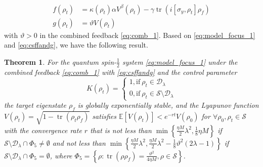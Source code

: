 \documentclass[]{elsarticle}
\newtheorem{thm}{Theorem}
\begin{document}
\begin{subequations}\label{eq:csffandg}
	\begin{align}
		f\left(\rho_t\right)&=\kappa\left(\rho_{t}\right)\alpha V^{\beta}\left(\rho_{t}\right)-\gamma \operatorname{tr}\left(i\left[\sigma_{y}, \rho_{t}\right] \rho_f\right)\\
		g\left(\rho_t\right)&=\vartheta V\left(\rho_{t}\right)
	\end{align}
\end{subequations}
with $\vartheta>0$ in the combined feedback \eqref{eq:comb_1}.
Based on \eqref{eq:model_focus_1} and \eqref{eq:csffandg}, we have the following result.
\begin{thm}\label{thm:exponentially_stable_f1}
	For the quantum spin-$\frac{1}{2}$ system \eqref{eq:model_focus_1} under the combined feedback \eqref{eq:comb_1} with \eqref{eq:csffandg} and the control parameter
	\begin{equation}\label{eq:kappa_1}
		K\left(\rho_t\right)=\left\{ \begin{array}{l}1, \text{if}~\rho_t\in \mathcal{D}_\lambda\\ 0, \text{if}~\rho_t\in \mathcal{S}\setminus \mathcal{D}_\lambda\end{array} \right. 
	\end{equation}
	the target eigenstate $\rho_f$ is globally exponentially stable, and the Lyapunov function $V(\rho_{t})=\sqrt{1-\operatorname{tr}\left(\rho_t\rho_f\right)}$ satisfies $\mathbb{E}\left[V\left(\rho_{t}\right)\right]<e^{-rt} V\left(\rho_{0}\right)$ for $\forall \rho_0, \rho_{t}\in \mathcal{S}$ with the convergence rate $r$ that is not less than $\min\left\{\frac{{\eta M}}{2}\lambda^{2}, \frac{1}{8}\eta M\right\}$ if $\mathcal{S}\setminus \mathcal{D}_\lambda\cap\Phi_5\neq\emptyset$ and not less than $\min\left\{\frac{{\eta M}}{2}\lambda^{2}, \frac{{\eta M}}{2}\lambda^{2}-\frac{1}{8}\vartheta^2\left(2\lambda-1\right)\right\}$ if $\mathcal{S}\setminus \mathcal{D}_\lambda\cap\Phi_5=\emptyset$, where $\Phi_5=\left\{\rho:\operatorname{tr}\left(\rho\rho_f\right)=\frac{\vartheta^2}{4\eta M}, \rho\in \mathcal{S}\right\}$. 
\end{thm}
\end{document}
